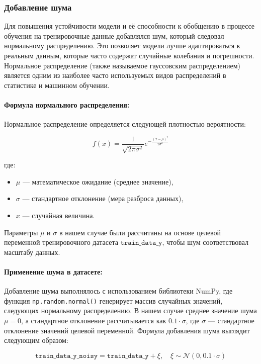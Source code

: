 \subsubsection{Добавление шума}

Для повышения устойчивости модели и её способности к обобщению в процессе обучения на тренировочные данные добавлялся шум, который следовал нормальному распределению. Это позволяет модели лучше адаптироваться к реальным данным, которые часто содержат случайные колебания и погрешности. Нормальное распределение (также называемое гауссовским распределением) является одним из наиболее часто используемых видов распределений в статистике и машинном обучении.

\paragraph{Формула нормального распределения:}
Нормальное распределение определяется следующей плотностью вероятности:

\[
f(x) = \frac{1}{\sqrt{2 \pi \sigma^2}} e^{-\frac{(x - \mu)^2}{2 \sigma^2}}
\]

где:
\begin{itemize}
    \item $\mu$ --- математическое ожидание (среднее значение),
    \item $\sigma$ --- стандартное отклонение (мера разброса данных),
    \item $x$ --- случайная величина.
\end{itemize}

Параметры $\mu$ и $\sigma$ в нашем случае были рассчитаны на основе целевой переменной тренировочного датасета $\texttt{train\_data\_y}$, чтобы шум соответствовал масштабу данных.

\paragraph{Применение шума в датасете:}
Добавление шума выполнялось с использованием библиотеки NumPy, где функция \texttt{np.random.normal()} генерирует массив случайных значений, следующих нормальному распределению. В нашем случае среднее значение шума $\mu = 0$, а стандартное отклонение рассчитывается как $0.1 \cdot \sigma$, где $\sigma$ --- стандартное отклонение значений целевой переменной. Формула добавления шума выглядит следующим образом:

\[
\texttt{train\_data\_y\_noisy} = \texttt{train\_data\_y} + \xi, \quad \xi \sim \mathcal{N}(0, 0.1 \cdot \sigma)
\]

